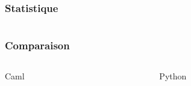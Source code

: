 

\begin{frame}
  \frametitle{Statistique}
  \begin{columns}
    \begin{column}{5cm}
      \tempTaille[0.6]
    \end{column}
    \begin{column}{5cm}
      \memoireTaille[0.6]
    \end{column}
  \end{columns}
\end{frame}

\begin{frame}
  \frametitle{Comparaison}
  \begin{columns}[c]
    \begin{column}{5cm}
      \begin{block}{\begin{center}Caml\end{center}}
        \tempTailleComp[0.6]
      \end{block}
    \end{column}
    \begin{column}{5cm}
      \begin{block}{\begin{center}Python\end{center}}
        \tempTailleAlex[0.6]
      \end{block}
    \end{column}
  \end{columns}
\end{frame}
